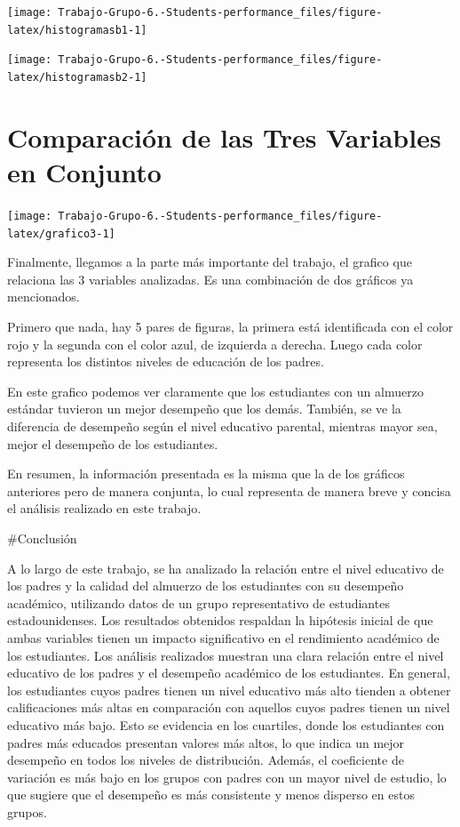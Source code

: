 \documentclass[
]{article}
\begin{document}
\begin{center}\texttt{[image: Trabajo-Grupo-6.-Students-performance\_files/figure-latex/histogramasb1-1]} \end{center}

\begin{center}\texttt{[image: Trabajo-Grupo-6.-Students-performance\_files/figure-latex/histogramasb2-1]} \end{center}

\section{Comparación de las Tres Variables en
Conjunto}\label{comparaciuxf3n-de-las-tres-variables-en-conjunto}

\begin{center}\texttt{[image: Trabajo-Grupo-6.-Students-performance\_files/figure-latex/grafico3-1]} \end{center}

Finalmente, llegamos a la parte más importante del trabajo, el grafico
que relaciona las 3 variables analizadas. Es una combinación de dos
gráficos ya mencionados.

Primero que nada, hay 5 pares de figuras, la primera está identificada
con el color rojo y la segunda con el color azul, de izquierda a
derecha. Luego cada color representa los distintos niveles de educación
de los padres.

En este grafico podemos ver claramente que los estudiantes con un
almuerzo estándar tuvieron un mejor desempeño que los demás. También, se
ve la diferencia de desempeño según el nivel educativo parental,
mientras mayor sea, mejor el desempeño de los estudiantes.

En resumen, la información presentada es la misma que la de los gráficos
anteriores pero de manera conjunta, lo cual representa de manera breve y
concisa el análisis realizado en este trabajo.

\#Conclusión

A lo largo de este trabajo, se ha analizado la relación entre el nivel
educativo de los padres y la calidad del almuerzo de los estudiantes con
su desempeño académico, utilizando datos de un grupo representativo de
estudiantes estadounidenses. Los resultados obtenidos respaldan la
hipótesis inicial de que ambas variables tienen un impacto significativo
en el rendimiento académico de los estudiantes. Los análisis realizados
muestran una clara relación entre el nivel educativo de los padres y el
desempeño académico de los estudiantes. En general, los estudiantes
cuyos padres tienen un nivel educativo más alto tienden a obtener
calificaciones más altas en comparación con aquellos cuyos padres tienen
un nivel educativo más bajo. Esto se evidencia en los cuartiles, donde
los estudiantes con padres más educados presentan valores más altos, lo
que indica un mejor desempeño en todos los niveles de distribución.
Además, el coeficiente de variación es más bajo en los grupos con padres
con un mayor nivel de estudio, lo que sugiere que el desempeño es más
consistente y menos disperso en estos grupos.
\end{document}
